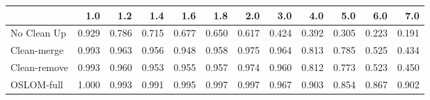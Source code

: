 \begin{tabular}{lrrrrrrrrrrr}
\toprule
{} &   1.0 &   1.2 &   1.4 &   1.6 &   1.8 &   2.0 &   3.0 &   4.0 &   5.0 &   6.0 &   7.0 \\
\midrule
No Clean Up  & 0.929 & 0.786 & 0.715 & 0.677 & 0.650 & 0.617 & 0.424 & 0.392 & 0.305 & 0.223 & 0.191 \\
Clean-merge  & 0.993 & 0.963 & 0.956 & 0.948 & 0.958 & 0.975 & 0.964 & 0.813 & 0.785 & 0.525 & 0.434 \\
Clean-remove & 0.993 & 0.960 & 0.953 & 0.955 & 0.957 & 0.974 & 0.960 & 0.812 & 0.773 & 0.523 & 0.450 \\
OSLOM-full   & 1.000 & 0.993 & 0.991 & 0.995 & 0.997 & 0.997 & 0.967 & 0.903 & 0.854 & 0.867 & 0.902 \\
\bottomrule
\end{tabular}
